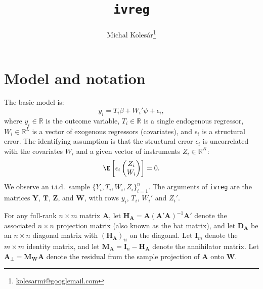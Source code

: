 \documentclass{mynotes}
\title{\texttt{ivreg}}%
\author{Michal
  Kolesár\thanks{\href{mailto:kolesarmi@googlemail.com}{kolesarmi@googlemail.com}}}%
\newcommand{\by}{\mathbf{Y}} %
\newcommand{\bt}{\mathbf{T}} %
\newcommand{\bz}{\mathbf{Z}} %
\newcommand{\bw}{\mathbf{W}} %
\newcommand{\eye}{\mathbf{I}} %
\newcommand{\Hm}[1]{\mathbf{H}_{#1}} %
\newcommand{\Dm}[1]{\mathbf{D}_{#1}} %
\newcommand{\Mm}[1]{\mathbf{M}_{#1}} %
\begin{document}
\maketitle

\section{Model and notation}
The basic model is:
\begin{equation}\label{eq:1}
  y_{i}=T_{i}\beta+W_{i}'\psi+\epsilon_{i},
\end{equation}
where $y_{i}\in\mathbb{R}$ is the outcome variable, $T_{i}\in\mathbb{R}$ is a
single endogenous regressor, $W_{i}\in\mathbb{R}^{L}$ is a vector of exogenous
regressors (covariates), and $\epsilon_{i}$ is a structural error. The
identifying assumption is that the structural error $\epsilon_{i}$ is
uncorrelated with the covariates $W_{i}$ and a given vector of instruments
$Z_{i}\in\mathbb{R}^{K}$:
\begin{equation}
  \label{eq:id}
  \E\left[\epsilon_{i}
    \begin{pmatrix}
      Z_{i}\\W_{i}
    \end{pmatrix}\right]
  =0.
\end{equation}
We observe an i.i.d.~sample $\{Y_{i},T_{i},W_{i},Z_{i}\}_{i=1}^{n}$. The
arguments of \lstinline!ivreg! are the matrices $\by$, $\bt$, $\bz$, and $\bw$,
with rows $y_{i}$, $T_{i}$, $W_{i}'$ and $Z_{i}'$.

For any full-rank $n\times m$ matrix $\mathbf{A}$, let
$\Hm{\mathbf{A}}=\mathbf{A}(\mathbf{A}'\mathbf{A})^{-1}\mathbf{A}'$ denote the
associated $n\times n$ projection matrix (also known as the hat matrix), and let
$\Dm{\mathbf{A}}$ be an $n\times n$ diagonal matrix with
$(\Hm{\mathbf{A}})_{ii}$ on the diagonal. Let $\eye_{m}$ denote the $m\times m$
identity matrix, and let $\Mm{\mathbf{A}}=\eye_{n}-\Hm{\mathbf{A}}$ denote the
annihilator matrix. Let $\mathbf{A}_{\perp}=\Mm{\bw}\mathbf{A}$ denote the
residual from the sample projection of $\mathbf{A}$ onto $\bw$.
\end{document}
